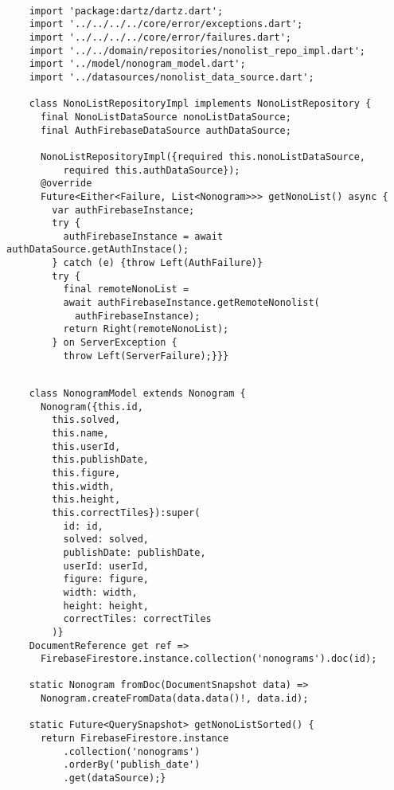     \begin{lstlisting}
      
    import 'package:dartz/dartz.dart';
    import '../../../../core/error/exceptions.dart';
    import '../../../../core/error/failures.dart';
    import '../../domain/repositories/nonolist_repo_impl.dart';
    import '../model/nonogram_model.dart';
    import '../datasources/nonolist_data_source.dart';
    
    class NonoListRepositoryImpl implements NonoListRepository {
      final NonoListDataSource nonoListDataSource;
      final AuthFirebaseDataSource authDataSource;

      NonoListRepositoryImpl({required this.nonoListDataSource, 
          required this.authDataSource});
      @override
      Future<Either<Failure, List<Nonogram>>> getNonoList() async {
        var authFirebaseInstance;
        try {
          authFirebaseInstance = await authDataSource.getAuthInstace();
        } catch (e) {throw Left(AuthFailure)}
        try {
          final remoteNonoList = 
          await authFirebaseInstance.getRemoteNonolist(
            authFirebaseInstance);
          return Right(remoteNonoList);
        } on ServerException {
          throw Left(ServerFailure);}}}
    \end{lstlisting}

    \begin{lstlisting}

    class NonogramModel extends Nonogram {
      Nonogram({this.id,
        this.solved,
        this.name,
        this.userId,
        this.publishDate,
        this.figure, 
        this.width, 
        this.height, 
        this.correctTiles}):super(
          id: id,
          solved: solved,
          publishDate: publishDate,
          userId: userId,
          figure: figure,
          width: width,
          height: height,
          correctTiles: correctTiles
        )}
    DocumentReference get ref =>
      FirebaseFirestore.instance.collection('nonograms').doc(id);
      
    static Nonogram fromDoc(DocumentSnapshot data) =>
      Nonogram.createFromData(data.data()!, data.id);

    static Future<QuerySnapshot> getNonoListSorted() {
      return FirebaseFirestore.instance
          .collection('nonograms')
          .orderBy('publish_date')
          .get(dataSource);}
    \end{lstlisting}

